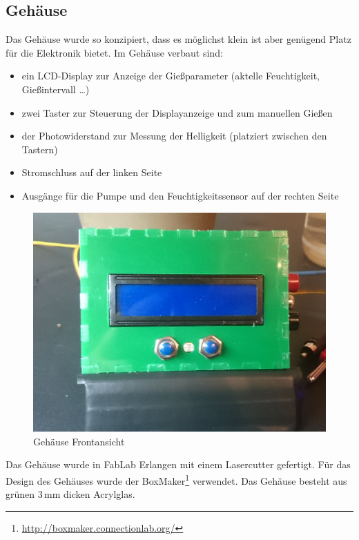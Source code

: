 	

\subsection{Gehäuse}
	Das Gehäuse wurde so konzipiert, dass es möglichst klein ist aber genügend Platz für die Elektronik bietet.
	Im Gehäuse verbaut sind:
\begin{itemize}
	\item ein LCD-Display zur Anzeige der Gießparameter (aktelle Feuchtigkeit, Gießintervall \dots)
	\item zwei Taster zur Steuerung der Displayanzeige und zum manuellen Gießen
	\item der Photowiderstand zur Messung der Helligkeit (platziert zwischen den Tastern)
	\item Stromschluss auf der linken Seite
	\item Ausgänge für die Pumpe und den Feuchtigkeitssensor auf der rechten Seite

\end{itemize}	

	\begin{figure}[!h]
	\centering
	\includegraphics[width=0.9\linewidth]{bilder/_boxFron1.jpg}	
	\caption{Gehäuse Frontansicht}
	\label{fig-Gehäuse}
	\end{figure}
	
Das Gehäuse wurde in FabLab Erlangen mit einem Lasercutter gefertigt. 
Für das Design des Gehäuses wurde der BoxMaker\footnote{ \href{http://boxmaker.connectionlab.org/}{http://boxmaker.connectionlab.org/}} verwendet. 
Das Gehäuse besteht aus grünen 3\,mm dicken Acrylglas.
	
